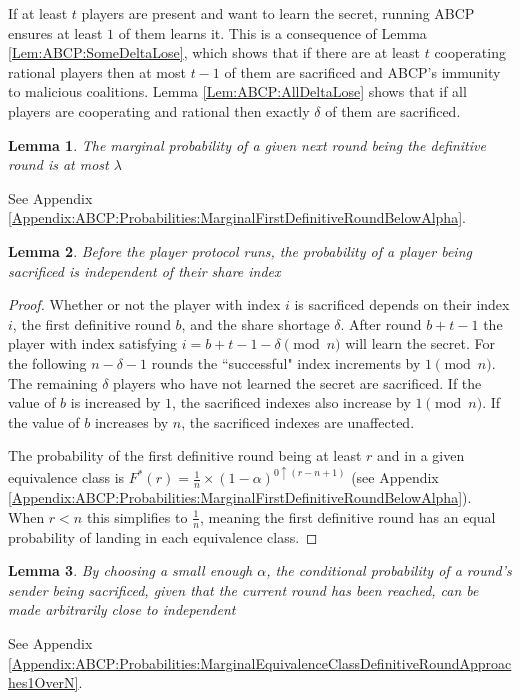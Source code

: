 \documentclass{dalcsthesis}
\newtheorem{lemma}{Lemma}
\begin{document}
If at least $t$ players are present and want to learn the secret, running ABCP ensures at least $1$ of them learns it. This is a consequence of Lemma \ref{Lem:ABCP:SomeDeltaLose}, which shows that if there are at least $t$ cooperating rational players then at most $t-1$ of them are sacrificed and ABCP's immunity to malicious coalitions. Lemma \ref{Lem:ABCP:AllDeltaLose} shows that if all players are cooperating and rational then exactly $\delta$ of them are sacrificed.

\begin{lemma} The marginal probability of a given next round being the definitive round is at most $\lambda$ \label{Lem:ABPC:MarginalAtMostLambda} \end{lemma}
See Appendix \ref{Appendix:ABCP:Probabilities:MarginalFirstDefinitiveRoundBelowAlpha}.

\begin{lemma} Before the player protocol runs, the probability of a player being sacrificed is independent of their share index \label{Lem:ABCP:FairSacrificeBefore} \end{lemma}
\begin{proof}
Whether or not the player with index $i$ is sacrificed depends on their index $i$, the first definitive round $b$, and the share shortage $\delta$. After round $b+t-1$ the player with index satisfying $i = b+t-1-\delta \pmod{n}$ will learn the secret. For the following $n-\delta-1$ rounds the ``successful" index increments by $1 \pmod{n}$. The remaining $\delta$ players who have not learned the secret are sacrificed. If the value of $b$ is increased by $1$, the sacrificed indexes also increase by $1 \pmod{n}$. If the value of $b$ increases by $n$, the sacrificed indexes are unaffected.

The probability of the first definitive round being at least $r$ and in a given equivalence class is $F^{*}(r) = \frac{1}{n} \times (1-\alpha)^{0 \uparrow (r - n + 1)}$ (see Appendix \ref{Appendix:ABCP:Probabilities:MarginalFirstDefinitiveRoundBelowAlpha}). When $r < n$ this simplifies to $\frac{1}{n}$, meaning the first definitive round has an equal probability of landing in each equivalence class.
\end{proof}

\begin{lemma} By choosing a small enough $\alpha$, the conditional probability of a round's sender being sacrificed, given that the current round has been reached, can be made arbitrarily close to independent \label{Lem:ABCP:FairerDuringWithSmallLambda} \end{lemma}
See Appendix \ref{Appendix:ABCP:Probabilities:MarginalEquivalenceClassDefinitiveRoundApproaches1OverN}.
\end{document}
